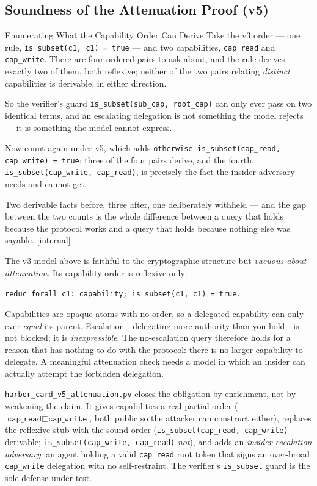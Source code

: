 \documentclass[11pt,a4paper]{article}
\theoremstyle{definition}
\begin{document}
\subsection{Soundness of the Attenuation Proof (v5)}\label{sec:attn-soundness}

\begin{pdexample}{Enumerating What the Capability Order Can Derive}
\setlength{\parskip}{4pt plus 1pt}
Take the v3 order --- one rule, \texttt{is\_subset(c1, c1) = true} --- and two
capabilities, \texttt{cap\_read} and \texttt{cap\_write}. There are four
ordered pairs to ask about, and the rule derives exactly two of them, both
reflexive; neither of the two pairs relating \emph{distinct} capabilities is
derivable, in either direction.

So the verifier's guard
\texttt{is\_subset(sub\_cap, root\_cap)} can only ever pass on two identical
terms, and an escalating delegation is not something the model rejects --- it
is something the model cannot express.

Now count again under v5, which adds
\texttt{otherwise is\_subset(cap\_read, cap\_write) = true}: three of the four
pairs derive, and the fourth, \texttt{is\_subset(cap\_write, cap\_read)}, is
precisely the fact the insider adversary needs and cannot get.

Two derivable
facts before, three after, one deliberately withheld --- and the gap between
the two counts is the whole difference between a query that holds because the
protocol works and a query that holds because nothing else was sayable.
[internal]
\end{pdexample}

The v3 model above is faithful to the cryptographic structure but \emph{vacuous about
attenuation}. Its capability order is reflexive only:
\begin{center}\texttt{reduc forall c1: capability; is\_subset(c1, c1) = true.}\end{center}
Capabilities are opaque atoms with no order, so a delegated capability can only
ever \emph{equal} its parent. Escalation---delegating more authority than you
hold---is not blocked; it is \emph{inexpressible}. The no-escalation query
therefore holds for a reason that has nothing to do with the protocol: there is
no larger capability to delegate. A meaningful attenuation check needs a model
in which an insider can actually attempt the forbidden delegation.

\texttt{harbor\_card\_v5\_attenuation.pv} closes the obligation by enrichment,
not by weakening the claim. It gives capabilities a real partial order
($\texttt{cap\_read} \sqsubset \texttt{cap\_write}$, both public so the
attacker can construct either), replaces the reflexive stub with the sound order
(\texttt{is\_subset(cap\_read, cap\_write)} derivable; \texttt{is\_subset(cap\_write,
cap\_read)} \emph{not}), and adds an \emph{insider escalation adversary}: an agent
holding a valid \texttt{cap\_read} root token that signs an over-broad
\texttt{cap\_write} delegation with no self-restraint. The verifier's
\texttt{is\_subset} guard is the sole defense under test.
\end{document}
